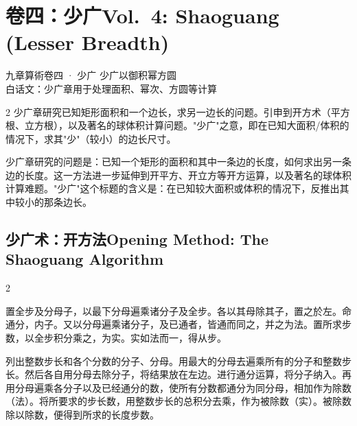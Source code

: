 \documentclass[11pt,a4paper]{article}
\newcommand{\bilingualsection}[2]{%
  \section{#1\hfill\normalfont\large\color{sectioncolor}#2}%
}
\newcommand{\bilingualsubsection}[2]{%
  \subsection{#1\hfill\normalfont\normalsize\color{sectioncolor}#2}%
}
\begin{document}
\newpage

\bilingualsection{卷四：少广}{Vol.\ 4: Shaoguang (Lesser Breadth)}

\begin{volumeheader}{九章算術卷四 · 少广}
少广以御积幂方圆\\[0.3em]
\small 白话文：少广章用于处理面积、幂次、方圆等计算
\end{volumeheader}

\vspace{0.5cm}

\begin{paracol}{2}
少广章研究已知矩形面积和一个边长，求另一边长的问题。引申到开方术（平方根、立方根），以及著名的球体积计算问题。"少广"之意，即在已知大面积/体积的情况下，求其"少"（较小）的边长尺寸。

\switchcolumn

少广章研究的问题是：已知一个矩形的面积和其中一条边的长度，如何求出另一条边的长度。这一方法进一步延伸到开平方、开立方等开方运算，以及著名的球体积计算难题。"少广"这个标题的含义是：在已知较大面积或体积的情况下，反推出其中较小的那条边长。

\end{paracol}

\vspace{0.5cm}

\bilingualsubsection{少广术：开方法}{Opening Method: The Shaoguang Algorithm}

\begin{paracol}{2}

\begin{methodbox}
置全步及分母子，以最下分母遍乘诸分子及全步。各以其母除其子，置之於左。命通分，内子。又以分母遍乘诸分子，及已通者，皆通而同之，并之为法。置所求步数，以全步积分乘之，为实。实如法而一，得从步。
\end{methodbox}

\switchcolumn

\begin{methodbox}
列出整数步长和各个分数的分子、分母。用最大的分母去遍乘所有的分子和整数步长。然后各自用分母去除分子，将结果放在左边。进行通分运算，将分子纳入。再用分母遍乘各分子以及已经通分的数，使所有分数都通分为同分母，相加作为除数（法）。将所要求的步长数，用整数步长的总积分去乘，作为被除数（实）。被除数除以除数，便得到所求的长度步数。
\end{methodbox}

\end{paracol}
\end{document}
